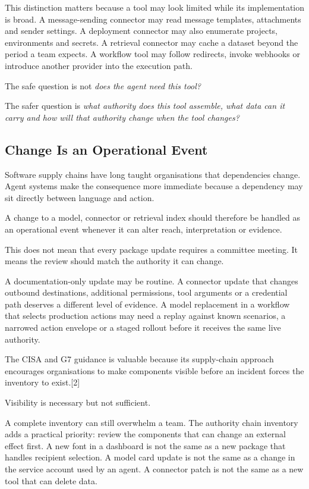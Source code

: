This distinction matters because a tool may look limited while its
implementation is broad. A message-sending connector may read message
templates, attachments and sender settings. A deployment connector may
also enumerate projects, environments and secrets. A retrieval connector
may cache a dataset beyond the period a team expects. A workflow tool
may follow redirects, invoke webhooks or introduce another provider into
the execution path.

The safe question is not \emph{does the agent need this tool?}

The safer question is \emph{what authority does this tool assemble, what
data can it carry and how will that authority change when the tool
changes?}

\subsection{Change Is an Operational
Event}\label{change-is-an-operational-event}

Software supply chains have long taught organisations that dependencies
change. Agent systems make the consequence more immediate because a
dependency may sit directly between language and action.

A change to a model, connector or retrieval index should therefore be
handled as an operational event whenever it can alter reach,
interpretation or evidence.

This does not mean that every package update requires a committee
meeting. It means the review should match the authority it can change.

A documentation-only update may be routine. A connector update that
changes outbound destinations, additional permissions, tool arguments or
a credential path deserves a different level of evidence. A model
replacement in a workflow that selects production actions may need a
replay against known scenarios, a narrowed action envelope or a staged
rollout before it receives the same live authority.

The CISA and G7 guidance is valuable because its supply-chain approach
encourages organisations to make components visible before an incident
forces the inventory to exist.{[}2{]}

Visibility is necessary but not sufficient.

A complete inventory can still overwhelm a team. The authority chain
inventory adds a practical priority: review the components that can
change an external effect first. A new font in a dashboard is not the
same as a new package that handles recipient selection. A model card
update is not the same as a change in the service account used by an
agent. A connector patch is not the same as a new tool that can delete
data.

